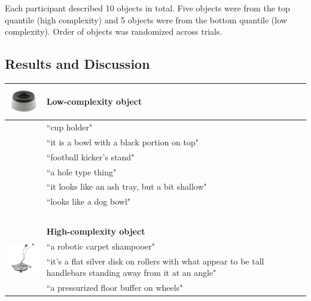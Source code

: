 Each participant described 10 objects in total. Five objects were from the top quantile (high complexity) and 5 objects were from the bottom quantile (low complexity). Order of objects was randomized across trials.

\subsection{Results and Discussion}


\begin{table}[t!]
\centering

\begin{tabular}{ll}
\toprule
\multirow{6}{*}{\includegraphics[width=2cm]{figs/obj_29_p2.jpg}} & \textbf{Low-complexity object}                \\
\toprule
                   & ``cup holder"                                   \\
                   & ``it is a bowl with a black portion on top"      \\
                   & ``football kicker's stand"                      \\
                   & ``a hole type thing"                              \\
                   & ``it looks like an ash tray, but a bit shallow" \\
                   & ``looks like a dog bowl" \\
 \bottomrule
~ & ~ \\
  \toprule
\multirow{6}{*}{\includegraphics[width=1.8cm]{figs/obj_27_p2.jpg}} & \textbf{High-complexity object}               \\
\toprule
                   & ``a robotic carpet shampooer"                                   \\
                   & \multicolumn{1}{p{12cm}}{ ``it's a flat silver disk on rollers with what appear to be tall handlebars standing away from it at an angle"}                     \\
                   & ``a pressurized floor buffer on wheels"                                   \\

\end{tabular}
\end{table}
